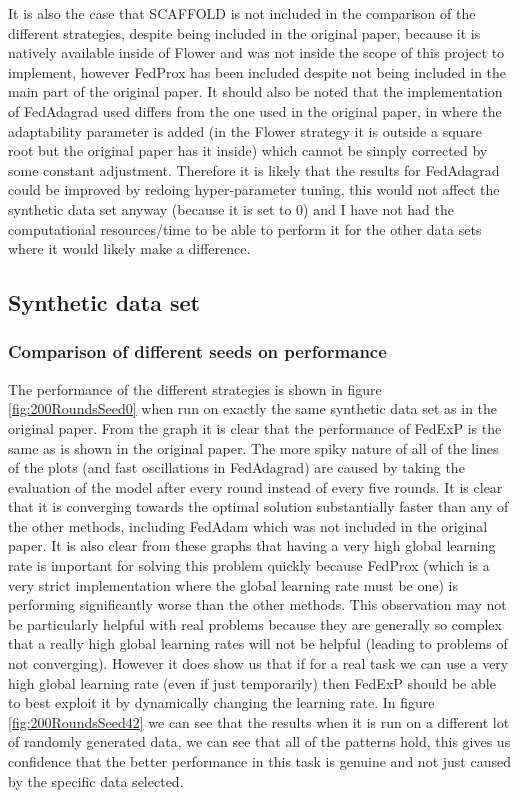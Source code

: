 \documentclass{article}
\begin{document}
It is also the case that SCAFFOLD is not included in the comparison of the different strategies, despite being included in the original paper, because it is natively available inside of Flower and was not inside the scope of this project to implement, however FedProx has been included despite not being included in the main part of the original paper.  It should also be noted that the implementation of FedAdagrad used differs from the one used in the original paper, in where the adaptability parameter is added (in the Flower strategy it is outside a square root but the original paper has it inside) which cannot be simply corrected by some constant adjustment.  Therefore it is likely that the results for FedAdagrad could be improved by redoing hyper-parameter tuning, this would not affect the synthetic data set anyway (because it is set to 0) and I have not had the computational resources/time to be able to perform it for the other data sets where it would likely make a difference.

\subsection{Synthetic data set}

\subsubsection{Comparison of different seeds on performance}

The performance of the different strategies is shown in figure \ref{fig:200RoundsSeed0} when run on exactly the same synthetic data set as in the original paper.  From the graph it is clear that the performance of FedExP is the same as is shown in the original paper.  The more spiky nature of all of the lines of the plots (and fast oscillations in FedAdagrad) are caused by taking the evaluation of the model after every round instead of every five rounds.  It is clear that it is converging towards the optimal solution substantially faster than any of the other methods, including FedAdam which was not included in the original paper.  It is also clear from these graphs that having a very high global learning rate is important for solving this problem quickly because FedProx (which is a very strict implementation where the global learning rate must be one) is performing significantly worse than the other methods.  This observation may not be particularly helpful with real problems because they are generally so complex that a really high global learning rates will not be helpful (leading to problems of not converging).  However it does show us that if for a real task we can use a very high global learning rate (even if just temporarily) then FedExP should be able to best exploit it by dynamically changing the learning rate.  In figure \ref{fig:200RoundsSeed42} we can see that the results when it is run on a different lot of randomly generated data, we can see that all of the patterns hold, this gives us confidence that the better performance in this task is genuine and not just caused by the specific data selected.
\end{document}
